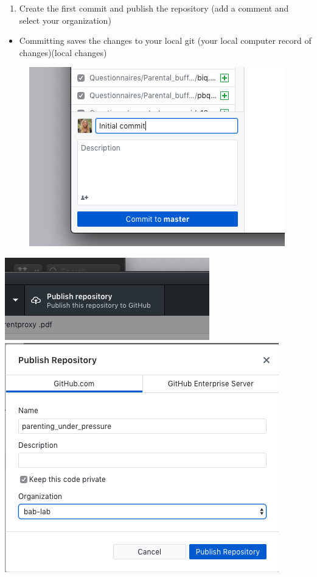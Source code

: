 \documentclass[]{book}
\providecommand{\tightlist}{%
  \setlength{\itemsep}{0pt}\setlength{\parskip}{0pt}}
\begin{document}
\begin{enumerate}
\def\labelenumi{\arabic{enumi}.}
\setcounter{enumi}{6}
\tightlist
\item
  Create the first commit and publish the repository (add a comment and select your organization)
\end{enumerate}

\begin{itemize}
\tightlist
\item
  Committing saves the changes to your local git (your local computer record of changes)(local changes)
\end{itemize}

\begin{figure}
\centering
\includegraphics{images/research_protocols/github/11.png}
\caption{}
\end{figure}

\includegraphics{images/research_protocols/github/7.png}
\includegraphics{images/research_protocols/github/8.png}
\end{document}
